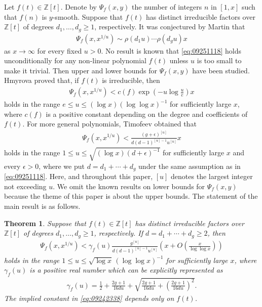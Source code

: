 \documentclass[a4paper,11pt]{amsart}
\newtheorem{theorem}{Theorem}[section]
\theoremstyle{definition}
\numberwithin{equation}{section}
\begin{document}
Let $f(t) \in \mathbb{Z}[t]$. 
Denote by $\Psi_f(x,y)$ the number of integers $n$ in $[1,x]$ such that $f(n)$ is $y$-smooth. 
Suppose that $f(t)$ has distinct irreducible factors over $\mathbb{Z}[t]$ of degrees $d_1, \ldots, d_g \geq1$, respectively. 
It was conjectured by Martin \cite{Martin2002} that 
\begin{align}\label{eq:09251118}
\Psi_f(x,x^{1/u})
\sim \rho(d_1u) \cdots \rho(d_gu) x
\end{align}
as $x \to\infty$ for every fixed $u>0$. 
No result is known that \eqref{eq:09251118} holds unconditionally for any non-linear polynomial $f(t)$ unless $u$ is too small to make it trivial. 
Then upper and lower bounds for $\Psi_f(x,y)$ have been studied. 
Hmyrova \cite{Hmyrova1966} proved that, if $f(t)$ is irreducible, then 
\begin{align*}
\Psi_f(x,x^{1/u})
< c(f) \exp\left(-u \log{\frac{u}{e}}\right) x
\end{align*}
holds in the range $e \leq u \leq (\log{x})(\log\log{x})^{-1}$ for sufficiently large $x$, where $c(f)$ is a positive constant depending on the degree and coefficients of $f(t)$. 
For more general polynomials, Timofeev \cite{Timofeev1977} obtained that
\begin{align*}
\Psi_f(x,x^{1/u})
< \frac{(g+\epsilon)^{[u]}}{d(d-1)^{[u]-1}u^{[u]}} x
\end{align*}
holds in the range $1 \leq u \leq \sqrt{(\log{x})(d+\epsilon)^{-1}}$ for sufficiently large $x$ and every $\epsilon>0$, where we put $d=d_1+\cdots+d_g$ under the same assumption as in \eqref{eq:09251118}. 
Here, and throughout this paper, $[u]$ denotes the largest integer not exceeding $u$. 
We omit the known results on lower bounds for $\Psi_f(x,y)$ because the theme of this paper is about the upper bounds. 
The statement of the main result is as follows. 

\begin{theorem}\label{thm:1.1}
Suppose that $f(t) \in \mathbb{Z}[t]$ has distinct irreducible factors over $\mathbb{Z}[t]$ of degrees $d_1, \ldots, d_g \geq1$, respectively. 
If $d=d_1+\cdots+d_g \geq2$, then 
\begin{align}\label{eq:09242338}
\Psi_f(x,x^{1/u})
< \gamma_f(u)
\frac{g^{[u]}}{d(d-1)^{[u]-1}u^{[u]}}
\left(x+O\left(\frac{x}{\log\log{x}}\right)\right)
\end{align}
holds in the range $1 \leq u \leq \sqrt{\log{x}}\, (\log\log{x})^{-1}$ for sufficiently large $x$, where $\gamma_f(u)$ is a positive real number which can be explicitly represented as
\begin{align}\label{eq:10031455}
\gamma_f(u)
= \frac{1}{2}+\frac{2g+1}{16du}+\sqrt{\frac{2g+1}{16du}+\left(\frac{2g+1}{16du}\right)^2}. 
\end{align}
The implied constant in \eqref{eq:09242338} depends only on $f(t)$.
\end{theorem}
\end{document}
